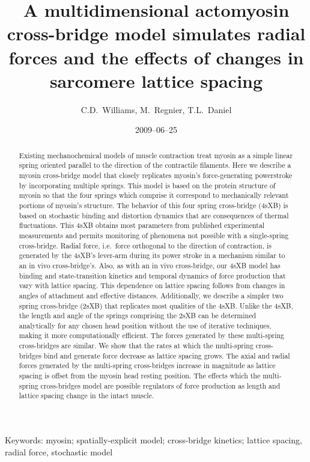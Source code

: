 \documentclass[]{article}
\title{A multidimensional actomyosin cross-bridge model simulates radial forces and the effects of changes in sarcomere lattice spacing}
\author{C.D.\ Williams, M.\ Regnier, T.L.\ Daniel}
\date{2009--06--25}
\begin{document}
\maketitle{}

\begin{abstract} 
Existing mechanochemical models of muscle contraction treat myosin as a simple linear spring oriented parallel to the direction of the contractile filaments.
Here we describe a myosin cross-bridge model that closely replicates myosin's force-generating powerstroke by incorporating multiple springs. 
This model is based on the protein structure of myosin so that the four springs which comprise it correspond to mechanically relevant portions of myosin's structure.
The behavior of this four spring cross-bridge (4sXB) is based on stochastic binding and distortion dynamics that are consequences of thermal fluctuations.  
This 4sXB obtains most parameters from published experimental measurements and permits monitoring of phenomena not possible with a single-spring cross-bridge.
Radial force, i.e.\ force orthogonal to the direction of contraction, is generated by the 4sXB's lever-arm during its power stroke in a mechanism similar to an in vivo cross-bridge's. 
Also, as with an in vivo cross-bridge, our 4sXB model has binding and state-transition kinetics and temporal dynamics of force production that vary with lattice spacing. 
This dependence on lattice spacing follows from changes in angles of attachment and effective distances. 
Additionally, we describe a simpler two spring cross-bridge (2sXB) that replicates most qualities of the 4sXB.
Unlike the 4sXB, the length and angle of the springs comprising the 2sXB can be determined analytically for any chosen head position without the use of iterative techniques,  making it more computationally efficient.
The forces generated by these multi-spring cross-bridges are similar. 
We show that the rates at which the multi-spring cross-bridges bind and generate force decrease as lattice spacing grows. 
The axial and radial forces generated by the multi-spring cross-bridges increase in magnitude as lattice spacing is offset from the myosin head resting position. 
The effects which the multi-spring cross-bridges model are possible regulators of force production as length and lattice spacing change in the intact muscle.
\end{abstract}

Keywords: myosin; spatially-explicit model; cross-bridge kinetics; lattice spacing, radial force, stochastic model
\end{document}
